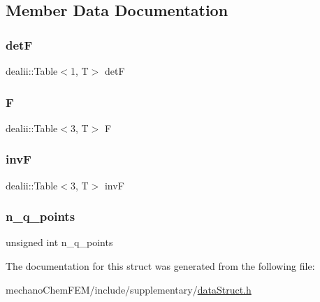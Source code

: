 \subsection{Member Data Documentation}
\mbox{\label{structdeformation_map_aa1ff2dc8fb6f4f6e9125ca026505a977}} 
\subsubsection{\texorpdfstring{detF}{detF}}
{\footnotesize\ttfamily dealii\+::\+Table$<$1, T$>$ detF}

\mbox{\label{structdeformation_map_a7934bed7ba72b5e4a3af1fd8a4e14198}} 
\subsubsection{\texorpdfstring{F}{F}}
{\footnotesize\ttfamily dealii\+::\+Table$<$3, T$>$ F}

\mbox{\label{structdeformation_map_ae40deb9e4616ec6d0b77519e56646ce0}} 
\subsubsection{\texorpdfstring{invF}{invF}}
{\footnotesize\ttfamily dealii\+::\+Table$<$3, T$>$ invF}

\mbox{\label{structdeformation_map_a75df8197cf561419d8ead67373abeafd}} 
\subsubsection{\texorpdfstring{n\_q\_points}{n\_q\_points}}
{\footnotesize\ttfamily unsigned int n\+\_\+q\+\_\+points}



The documentation for this struct was generated from the following file\+:\begin{DoxyCompactItemize}
\item 
mechano\+Chem\+F\+E\+M/include/supplementary/\mbox{\hyperlink{data_struct_8h}{data\+Struct.\+h}}\end{DoxyCompactItemize}
